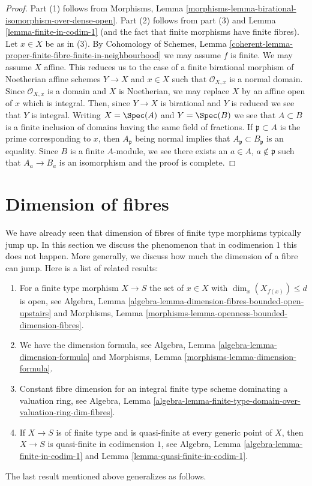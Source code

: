\begin{proof}
Part (1) follows from Morphisms, Lemma
\ref{morphisms-lemma-birational-isomorphism-over-dense-open}.
Part (2) follows from part (3) and Lemma \ref{lemma-finite-in-codim-1}
(and the fact that finite morphisms have finite fibres).
Let $x \in X$ be as in (3). By
Cohomology of Schemes, Lemma
\ref{coherent-lemma-proper-finite-fibre-finite-in-neighbourhood}
we may assume $f$ is finite. We may assume $X$ affine.
This reduces us to
the case of a finite birational morphism of Noetherian affine schemes
$Y \to X$ and $x \in X$ such that $\mathcal{O}_{X, x}$ is a
normal domain. Since $\mathcal{O}_{X, x}$ is a domain and $X$
is Noetherian, we may replace $X$ by an affine open of $x$ which
is integral. Then, since $Y \to X$ is birational and $Y$ is reduced
we see that $Y$ is integral. Writing $X = \Spec(A)$ and $Y = \Spec(B)$
we see that $A \subset B$ is a finite inclusion of domains having the same
field of fractions. If $\mathfrak p \subset A$ is the prime corresponding
to $x$, then $A_\mathfrak p$ being normal implies that
$A_\mathfrak p \subset B_\mathfrak p$ is an equality.
Since $B$ is a finite $A$-module, we see there exists an
$a \in A$, $a \not \in \mathfrak p$ such that $A_a \to B_a$
is an isomorphism and the proof is complete.
\end{proof}








\section{Dimension of fibres}
\label{section-dimension-fibres}

\noindent
We have already seen that dimension of fibres of finite type morphisms
typically jump up. In this section we discuss the phenomenon that in
codimension $1$ this does not happen. More generally, we discuss how
much the dimension of a fibre can jump. Here is a list of related results:
\begin{enumerate}
\item For a finite type morphism $X \to S$ the set of
$x \in X$ with $\dim_x(X_{f(x)}) \leq d$ is open, see
Algebra, Lemma \ref{algebra-lemma-dimension-fibres-bounded-open-upstairs}
and
Morphisms, Lemma \ref{morphisms-lemma-openness-bounded-dimension-fibres}.
\item We have the dimension formula, see
Algebra, Lemma \ref{algebra-lemma-dimension-formula} and
Morphisms, Lemma \ref{morphisms-lemma-dimension-formula}.
\item Constant fibre dimension for an integral finite type scheme
dominating a valuation ring, see Algebra, Lemma
\ref{algebra-lemma-finite-type-domain-over-valuation-ring-dim-fibres}.
\item If $X \to S$ is of finite type and is quasi-finite at every
generic point of $X$, then $X \to S$ is quasi-finite in codimension $1$, see
Algebra, Lemma \ref{algebra-lemma-finite-in-codim-1} and
Lemma \ref{lemma-quasi-finite-in-codim-1}.
\end{enumerate}
The last result mentioned above generalizes as follows.

